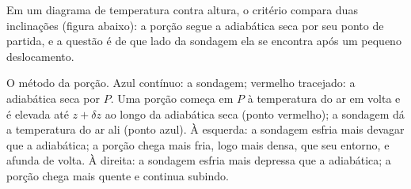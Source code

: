 
Em um diagrama de temperatura contra altura, o critério compara duas inclinações (figura abaixo):
a porção segue a adiabática seca por seu ponto de partida, e a questão é de que lado da sondagem
ela se encontra após um pequeno deslocamento.

\begin{omfigure}

{\small O método da porção. Azul contínuo: a sondagem; vermelho tracejado: a adiabática seca por
$P$. Uma porção começa em $P$ à temperatura do ar em volta e é elevada até $z + \delta z$ ao longo
da adiabática seca (ponto vermelho); a sondagem dá a temperatura do ar ali (ponto azul). À
esquerda: a sondagem esfria mais devagar que a adiabática; a porção chega mais fria, logo mais
densa, que seu entorno, e afunda de volta. À direita: a sondagem esfria mais depressa que a
adiabática; a porção chega mais quente e continua subindo.}
\label{fig:b1:fluid-envelopes-structure:parcel}
\end{omfigure}

